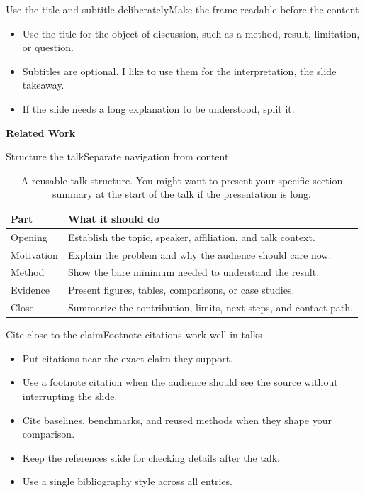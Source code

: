 \documentclass[aspectratio=169]{beamer}
\renewcommand{\cite}[1]{\texorpdfstring{\footfullcite{#1}}{}}
\newcommand{\fixedtopspacing}{\vspace{0.35em}}
\newcommand{\sectionframe}[1]{%
  \begin{frame}{}
    \vfill
    \begin{center}
      \Huge \textbf{#1}
    \end{center}
    \vfill
  \end{frame}
}
\begin{document}
\begin{frame}{Use the title and subtitle deliberately}{Make the frame readable before the content}
\fixedtopspacing
\begin{itemize}
  \item Use the title for the object of discussion, such as a method, result, limitation, or question.
  \item Subtitles are optional. I like to use them for the interpretation, the slide takeaway.
  \item If the slide needs a long explanation to be understood, split it.
\end{itemize}
\end{frame}

\sectionframe{Related Work}

\begin{frame}{Structure the talk}{Separate navigation from content}
\fixedtopspacing
\begin{table}[h]
\centering
\small
\begin{tabularx}{0.92\textwidth}{lX}
\toprule
\textbf{Part} & \textbf{What it should do} \\
\midrule
Opening & Establish the topic, speaker, affiliation, and talk context. \\
Motivation & Explain the problem and why the audience should care now. \\
Method & Show the bare minimum needed to understand the result. \\
Evidence & Present figures, tables, comparisons, or case studies. \\
Close & Summarize the contribution, limits, next steps, and contact path. \\
\bottomrule
\end{tabularx}
\caption{A reusable talk structure. You might want to present your specific section summary at the start of the talk if the presentation is long.}
\end{table}
\end{frame}

\begin{frame}{Cite close to the claim}{Footnote citations work well in talks}
\fixedtopspacing
\begin{itemize}
  \item Put citations near the exact claim they support.
  \item Use a footnote citation when the audience should see the source without interrupting the slide.\cite{li2023theory}
  \item Cite baselines, benchmarks, and reused methods when they shape your comparison.\cite{yu2022surprising}
  \item Keep the references slide for checking details after the talk.
  \item Use a single bibliography style across all entries.
\end{itemize}
\end{frame}
\end{document}
